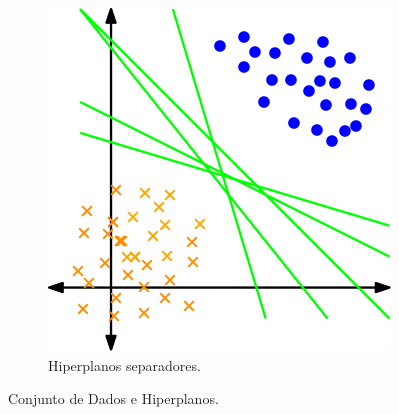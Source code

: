 \documentclass[12pt,a4paper]{scrartcl}
\theoremstyle{definition}%
\begin{document}
\begin{figure}[htbp]
\begin{subfigure}[h]{0.38\textwidth}
		\includegraphics[width=\textwidth]{hiperplanos_separadores}
		\caption{Hiperplanos separadores. \label{fig:dados_e_hiperplanos:hiperplanos_separadores}}
	\end{subfigure}
\caption{Conjunto de Dados e Hiperplanos. \label{fig:dados_e_hiperplanos}}
\end{figure}
\end{document}
